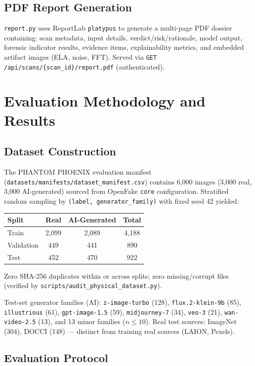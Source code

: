 \documentclass[10pt,conference,compsoc]{IEEEtran}
\begin{document}
\subsection{PDF Report Generation}
\label{sec:pdf}

\texttt{report.py} uses ReportLab \texttt{platypus} to generate a multi-page PDF dossier containing:
scan metadata, input details, verdict/risk/rationale, model output, forensic indicator results, evidence items, explainability metrics, and embedded artifact images (ELA, noise, FFT).
Served via \texttt{GET /api/scans/\{scan\_id\}/report.pdf} (authenticated).

\section{Evaluation Methodology and Results}
\label{sec:evaluation}

\subsection{Dataset Construction}
\label{sec:dataset}

The PHANTOM PHOENIX evaluation manifest (\texttt{datasets/manifests/dataset\_manifest.csv}) contains 6,000 images (3,000 real, 3,000 AI-generated) sourced from OpenFake \texttt{core} configuration.
Stratified random sampling by \texttt{(label, generator\_family)} with fixed seed 42 yielded:
\begin{center}
\begin{tabular}{lccc}
\toprule
Split & Real & AI-Generated & Total \\
\midrule
Train & 2,099 & 2,089 & 4,188 \\
Validation & 449 & 441 & 890 \\
Test & 452 & 470 & 922 \\
\bottomrule
\end{tabular}
\end{center}
Zero SHA-256 duplicates within or across splits; zero missing/corrupt files (verified by \texttt{scripts/audit\_physical\_dataset.py}).

Test-set generator families (AI): \texttt{z-image-turbo} (128), \texttt{flux.2-klein-9b} (85), \texttt{illustrious} (61), \texttt{gpt-image-1.5} (59), \texttt{midjourney-7} (34), \texttt{veo-3} (21), \texttt{wan-video-2.5} (13), and 13 minor families ($n \le 10$).
Real test sources: ImageNet (304), DOCCI (148) — distinct from training real sources (LAION, Pexels).

\subsection{Evaluation Protocol}
\label{sec:eval-protocol}
\end{document}

